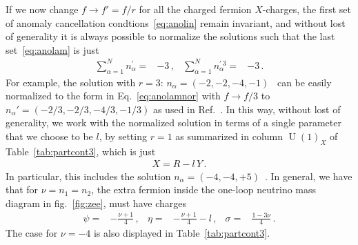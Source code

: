\documentclass[12pt]{article}
\begin{document}
If we now change $f\to f'= f/r$ for all the charged fermion $X$-charges, the
first set of anomaly cancellation condtions~\eqref{eq:anolin} remain
invariant, and without lost of generality it is always possible to
normalize the solutions such that the last set~\eqref{eq:anolam} is
just
\begin{align}
  \label{eq:anolamnor}
   \sum_{\alpha=1}^{N} n_{\alpha}^{\prime}=&-3\,,   & \sum_{\alpha=1}^{N} n_{\alpha}^{\prime\, 3}=&-3\,.
\end{align}
For example, the solution with $r=3$: $n_{\alpha}=\left( -2,-2,-4,-1 \right)$~\cite{Appelquist:2002mw} can be easily normalized to the form in Eq.~\eqref{eq:anolamnor} with $f\to f/3$
to $n_{\alpha}'=\left( -2/3,-2/3,-4/3,-1/3 \right)$
as used in Ref.~\cite{Patra:2016ofq}. In this way, without lost of generality, we work with the normalized solution in terms of a single parameter~\cite{Jenkins:1987ue,Oda:2015gna,Okada:2018tgy} that we choose to be $l$, by setting $r=1$ as summarized in column $\operatorname{U}(1)_X$ of Table~\ref{tab:partcont3}, which is just
\begin{align}
  X=R-l\, Y\,.
\end{align}
In particular, this includes the solution  $n_{\alpha}=(-4,-4,+5)$~\cite{Appelquist:2002mw}. 
In general, we have that for $\nu=n_1=n_2$, the extra fermion inside the one-loop neutrino mass diagram in fig.~\ref{fig:zee}, must have charges
\begin{align}
  \psi=&-\frac{\nu+1}{4}\,,&\eta=&-\frac{\nu+1}{4}-l\,,&\sigma=&\frac{1-3\nu}{4}\,.
\end{align}
The case for $\nu=-4$ is also displayed in Table~\ref{tab:partcont3}.

%
%
%

%

\end{document}
